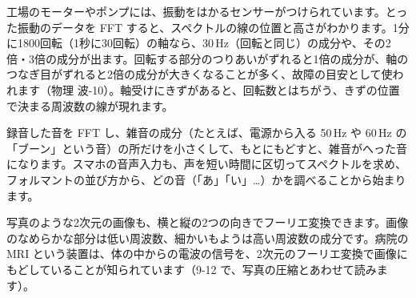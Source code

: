 \begin{butsuri}
\noindent\begin{minipage}[c]{0.62\linewidth}
\raggedright
工場のモーターやポンプには、振動をはかるセンサーがつけられています。とった振動のデータを FFT すると、スペクトルの線の位置と高さがわかります。1分に1800回転（1秒に30回転）の軸なら、30\,Hz（回転と同じ）の成分や、その2倍・3倍の成分が出ます。回転する部分のつりあいがずれると1倍の成分が、軸のつなぎ目がずれると2倍の成分が大きくなることが多く、故障の目安として使われます（物理 波-10）。軸受けにきずがあると、回転数とはちがう、きずの位置で決まる周波数の線が現れます。
\end{minipage}\hfill
\begin{minipage}[c]{0.35\linewidth}
\centering
{}
\end{minipage}
\par\vspace{4pt}
録音した音を FFT し、雑音の成分（たとえば、電源から入る 50\,Hz や 60\,Hz の「ブーン」という音）の所だけを小さくして、もとにもどすと、雑音がへった音になります。スマホの音声入力も、声を短い時間に区切ってスペクトルを求め、フォルマントの並び方から、どの音（「あ」「い」…）かを調べることから始まります。
\par\vspace{4pt}
写真のような2次元の画像も、横と縦の2つの向きでフーリエ変換できます。画像のなめらかな部分は低い周波数、細かいもようは高い周波数の成分です。病院の MRI という装置は、体の中からの電波の信号を、2次元のフーリエ変換で画像にもどしていることが知られています（9-12 で、写真の圧縮とあわせて読みます）。
\end{butsuri}



\bkendproblems
{}


